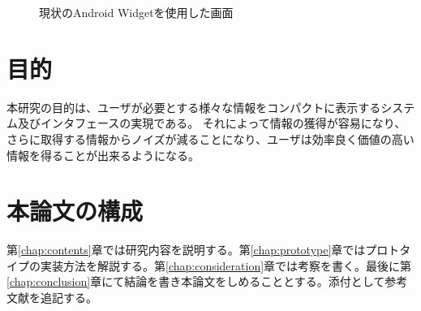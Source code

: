 \begin{figure}[htbp]
  \begin{minipage}{\hsize}
    \begin{center}
    \end{center}
    \caption{現状のAndroid Widgetを使用した画面}
    \label{fig:old_widget}
  \end{minipage}
\end{figure}

\section{目的}
本研究の目的は、ユーザが必要とする様々な情報をコンパクトに表示するシステム及びインタフェースの実現である。
それによって情報の獲得が容易になり、さらに取得する情報からノイズが減ることになり、ユーザは効率良く価値の高い情報を得ることが出来るようになる。

\section{本論文の構成}

第\ref{chap:contents}章では研究内容を説明する。第\ref{chap:prototype}章ではプロトタイプの実装方法を解説する。第\ref{chap:consideration}章では考察を書く。最後に第\ref{chap:conclusion}章にて結論を書き本論文をしめることとする。添付として参考文献を追記する。
